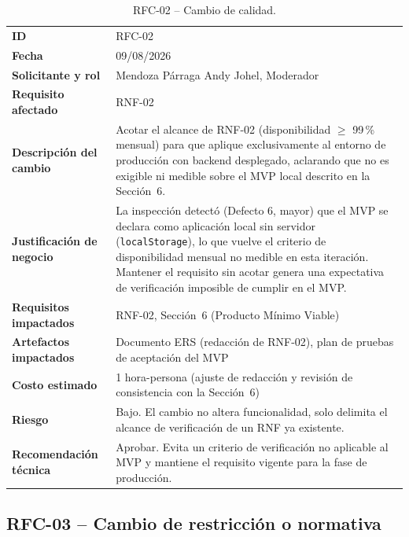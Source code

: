 \documentclass[journal,onecolumn]{IEEEtran}
\begin{document}
\begin{table}[H]
	\centering
	\small
	\begin{tabularx}{\textwidth}{@{}l X@{}}
		\toprule
		\textbf{ID} & RFC-02 \\
		\textbf{Fecha} & 09/08/2026 \\
		\textbf{Solicitante y rol} & Mendoza Párraga Andy Johel, Moderador \\
		\textbf{Requisito afectado} & RNF-02 \\
		\midrule
		\textbf{Descripción del cambio} & Acotar el alcance de RNF-02 (disponibilidad $\geq$ 99\,\% mensual) para que aplique exclusivamente al entorno de producción con backend desplegado, aclarando que no es exigible ni medible sobre el MVP local descrito en la Sección~6. \\
		\textbf{Justificación de negocio} & La inspección detectó (Defecto 6, mayor) que el MVP se declara como aplicación local sin servidor (\texttt{localStorage}), lo que vuelve el criterio de disponibilidad mensual no medible en esta iteración. Mantener el requisito sin acotar genera una expectativa de verificación imposible de cumplir en el MVP. \\
		\textbf{Requisitos impactados} & RNF-02, Sección~6 (Producto Mínimo Viable) \\
		\textbf{Artefactos impactados} & Documento ERS (redacción de RNF-02), plan de pruebas de aceptación del MVP \\
		\textbf{Costo estimado} & 1 hora-persona (ajuste de redacción y revisión de consistencia con la Sección~6) \\
		\textbf{Riesgo} & Bajo. El cambio no altera funcionalidad, solo delimita el alcance de verificación de un RNF ya existente. \\
		\textbf{Recomendación técnica} & Aprobar. Evita un criterio de verificación no aplicable al MVP y mantiene el requisito vigente para la fase de producción. \\
		\bottomrule
	\end{tabularx}
	\caption{RFC-02 -- Cambio de calidad.}
	\label{tab:rfc-02}
\end{table}

\subsection{RFC-03 -- Cambio de restricción o normativa}
\end{document}
